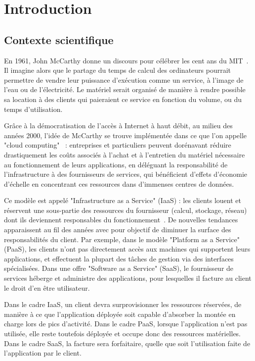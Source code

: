 \chapter{Introduction}

\section{Contexte scientifique}

En 1961, John McCarthy donne un discours pour célébrer les cent ans du MIT~\cite{greenberger1962management}. Il imagine alors que le partage du temps de calcul des ordinateurs pourrait permettre de vendre leur puissance d'exécution comme un service, à l'image de l'eau ou de l'électricité. Le matériel serait organisé de manière à rendre possible sa location à des clients qui paieraient ce service en fonction du volume, ou du temps d'utilisation.

Grâce à la démocratisation de l'accès à Internet à haut débit, au milieu des années 2000, l'idée de McCarthy se trouve implémentée dans ce que l'on appelle "cloud computing"~\cite{hayesCloudComputing2008} : entreprises et particuliers peuvent dorénavant réduire drastiquement les coûts associés à l'achat et à l'entretien du matériel nécessaire au fonctionnement de leurs applications, en déléguant la responsabilité de l'infrastructure à des fournisseurs de services, qui bénéficient d'effets d'économie d'échelle en concentrant ces ressources dans d'immenses centres de données.

Ce modèle est appelé "Infrastructure as a Service" (IaaS) : les clients louent et réservent une sous-partie des ressources du fournisseur (calcul, stockage, réseau) dont ils deviennent responsables du fonctionnement~\cite{mellNISTDefinitionCloud}. De nouvelles tendances apparaissent au fil des années avec pour objectif de diminuer la surface des responsabilités du client. Par exemple, dans le modèle "Platform as a Service" (PaaS), les clients n'ont pas directement accès aux machines qui supportent leurs applications, et effectuent la plupart des tâches de gestion via des interfaces spécialisées. Dans une offre "Software as a Service" (SaaS), le fournisseur de services héberge et administre des applications, pour lesquelles il facture au client le droit d'en être utilisateur.

Dans le cadre IaaS, un client devra surprovisionner les ressources réservées, de manière à ce que l'application déployée soit capable d'absorber la montée en charge lors de pics d'activité. Dans le cadre PaaS, lorsque l'application n'est pas utilisée, elle reste toutefois déployée et occupe donc des ressources matérielles. Dans le cadre SaaS, la facture sera forfaitaire, quelle que soit l'utilisation faite de l'application par le client.

